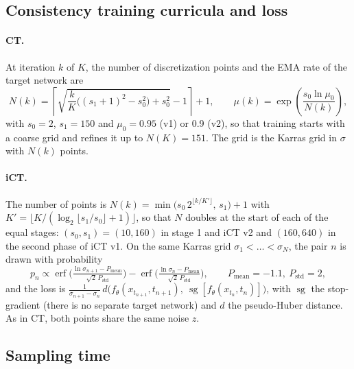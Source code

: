 \documentclass{article}
\begin{document}
\subsection{Consistency training curricula and loss}
\label{sec:app_ct}

\paragraph{CT.} At iteration $k$ of $K$, the number of discretization points
and the EMA rate of the target network are
\begin{equation}
  N(k) = \left\lceil \sqrt{\frac{k}{K}\big((s_1 + 1)^2 - s_0^2\big) + s_0^2} - 1 \right\rceil + 1,
  \qquad \mu(k) = \exp\!\left(\frac{s_0 \ln \mu_0}{N(k)}\right),
\end{equation}
with $s_0 = 2$, $s_1 = 150$ and $\mu_0 = 0.95$ (v1) or 0.9 (v2), so that training starts with a
coarse grid and refines it up to $N(K) = 151$. The grid is the Karras grid in
$\sigma$ with $N(k)$ points.

\paragraph{iCT.} The number of points is
$N(k) = \min\!\big(s_0\, 2^{\lfloor k / K' \rfloor},\, s_1\big) + 1$ with
$K' = \lfloor K / (\log_2\lfloor s_1 / s_0 \rfloor + 1) \rfloor$, so that
$N$ doubles at the start of each of the equal stages: $(s_0, s_1) = (10, 160)$
in stage 1 and iCT v2 and $(160, 640)$ in the second phase of iCT v1. On the same Karras grid
$\sigma_1 < \dots < \sigma_N$, the pair $n$ is drawn with probability
\begin{equation}
  p_n \propto \operatorname{erf}\!\Big(\tfrac{\ln\sigma_{n+1} - P_\text{mean}}{\sqrt{2}\,P_\text{std}}\Big)
  - \operatorname{erf}\!\Big(\tfrac{\ln\sigma_{n} - P_\text{mean}}{\sqrt{2}\,P_\text{std}}\Big),
  \qquad P_\text{mean} = -1.1,\ P_\text{std} = 2,
\end{equation}
and the loss is
$\frac{1}{\sigma_{n+1} - \sigma_n}\, d\big(f_\theta(x_{t_{n+1}}, t_{n+1}),\
\operatorname{sg}[f_\theta(x_{t_n}, t_n)]\big)$, with $\operatorname{sg}$ the
stop-gradient (there is no separate target network) and $d$ the pseudo-Huber
distance. As in CT, both points share the same noise $z$.

\subsection{Sampling time}
\label{sec:app_time}
\end{document}
